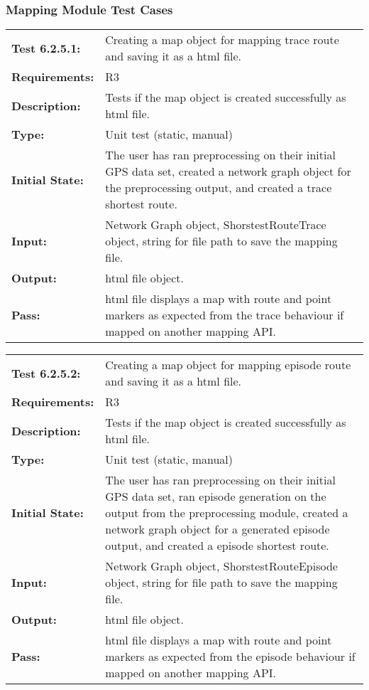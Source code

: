 \documentclass[12pt, titlepage]{article}
\begin{document}
{\subsubsection{Mapping Module Test Cases}
\begin{tabular}{|l|p{10cm}|}
    \hline
    \bf{Test} 6.2.5.1: & Creating a map object for mapping trace route and saving it as a html file.\\
    \bf{Requirements}: & R3 \\
    \bf{Description}: & Tests if the map object is created successfully as html file. \\
    \bf{Type}: & Unit test (static, manual) \\
    \bf{Initial State}: & The user has ran preprocessing on their initial GPS data set, created a network graph object for the preprocessing output, and created a trace shortest route. \\
    \bf{Input}: & Network Graph object, ShorstestRouteTrace object, string for file path to save the mapping file. \\
    \bf{Output}: & html file object. \\
    \bf{Pass}: & html file displays a map with route and point markers as expected from the trace behaviour if mapped on another mapping API. \\
    \hline
\end{tabular}
\begin{tabular}{|l|p{10cm}|}
    \hline
    \bf{Test} 6.2.5.2: & Creating a map object for mapping episode route and saving it as a html file.\\
    \bf{Requirements}: &  R3\\
    \bf{Description}: & Tests if the map object is created successfully as html file. \\
    \bf{Type}: & Unit test (static, manual) \\
    \bf{Initial State}: & The user has ran preprocessing on their initial GPS data set, ran episode generation on the output from the preprocessing module, created a network graph object for a generated episode output, and created a episode shortest route. \\
    \bf{Input}: & Network Graph object, ShorstestRouteEpisode object, string for file path to save the mapping file. \\
    \bf{Output}: & html file object. \\
    \bf{Pass}: & html file displays a map with route and point markers as expected from the episode behaviour if mapped on another mapping API. \\

\end{tabular}}
\end{document}
